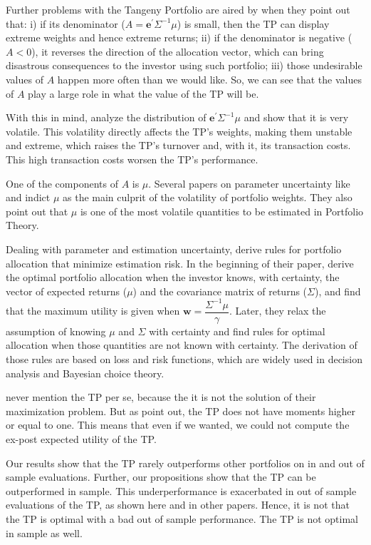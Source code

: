 \documentclass[12pt,oneside,a4paper]{memoir}
\begin{document}
Further problems with the Tangeny Portfolio are aired by  when they point out that: i) if its denominator ($A = \mathbf{e}^{\prime} \Sigma^{-1} \mu$) is small, then the TP can display extreme weights and hence extreme returns; ii) if  the denominator is negative ($A<0$), it reverses the direction of the allocation vector, which can bring disastrous consequences to the investor using such portfolio; iii) those undesirable values of $A$ happen more often than we would like. So, we can see that the values of $A$ play a large role in what the value of the TP will be.

With this in mind,  analyze the distribution of $\mathbf{e}^{\prime} \Sigma^{-1}\mu$ and show that it is very volatile. This volatility directly affects the TP's weights, making them unstable and extreme, which raises the TP's turnover and, with it, its transaction costs. This high transaction costs worsen the TP's performance.

One of the components of $A$ is $\mu$.
Several papers on parameter uncertainty like  and  indict $\mu$ as the main culprit of the volatility of portfolio weights.
They also point out that $\mu$ is one of the most volatile quantities to be estimated in Portfolio Theory.

Dealing with parameter and estimation uncertainty,  derive rules for portfolio allocation that minimize estimation risk.
In the beginning of their paper,  derive the optimal portfolio allocation when the investor knows, with certainty, the vector of expected returns ($\mu$) and the covariance matrix of returns ($\Sigma$), and find that the maximum utility is given when $\mathbf{w}=\dfrac{\Sigma^{-1}\mu}{\gamma}$. Later, they relax the assumption of knowing $\mu$ and $\Sigma$ with certainty and find rules for optimal allocation when those quantities are not known with certainty. The derivation of those rules are based on loss and risk functions, which are widely used in decision analysis and Bayesian choice theory.

 never mention the TP per se, because the it is not the solution of their maximization problem. But as  point out, the TP does not have moments higher or equal to one. This means that even if we wanted, we could not compute the ex-post expected utility of the TP.

Our results show that the TP rarely outperforms other portfolios on in and out of sample evaluations.  Further, our propositions show that the TP can be outperformed in sample.
This underperformance is exacerbated in out of sample evaluations of the TP, as shown here and in other papers. Hence, it is not that the TP is optimal with a bad out of sample performance. The TP is not optimal in sample as well.
\end{document}
